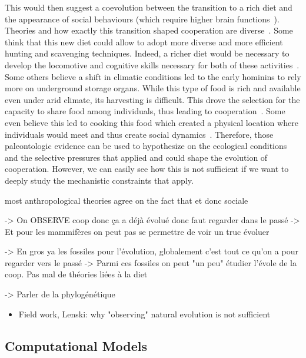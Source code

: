     This would then suggest a coevolution between the transition to a rich diet and the appearance of social behaviours (which require higher brain functions~\cite{Dunbar2007, Isler2012}). Theories and how exactly this transition shaped cooperation are diverse~\cite{Pontze2012}. Some think that this new diet could allow to adopt more diverse and more efficient hunting and scavenging techniques. Indeed, a richer diet would be necessary to develop the locomotive and cognitive skills necessary for both of these activities~\cite{Aiello1995, Bramble2004}. Some others believe a shift in climatic conditions led to the early hominins to rely more on underground storage organs. While this type of food is rich and available even under arid climate, its harvesting is difficult. This drove the selection for the capacity to share food among individuals, thus leading to cooperation~\cite{O'Connell2002}. Some even believe this led to cooking this food which created a physical location where individuals would meet and thus create social dynamics~\cite{Wrangham1999, Wrangham2009}. Therefore, those paleontologic evidence can be used to hypothesize on the ecological conditions and the selective pressures that applied and could shape the evolution of cooperation. However, we can easily see how this is not sufficient if we want to deeply study the mechanistic constraints that apply.



    most anthropological theories agree on the fact that 
    et donc sociale

    -> On OBSERVE coop donc ça a déjà évolué donc faut regarder dans le passé
        -> Et pour les mammifères on peut pas se permettre de voir un truc évoluer

    -> En gros ya les fossiles pour l'évolution, globalement c'est tout ce qu'on a pour regarder vers le passé
          -> Parmi ces fossiles on peut "un peu" étudier l'évole de la coop. Pas mal de théories liées à la diet

    -> Parler de la phylogénétique

    \begin{itemize}
      \item{Field work, Lenski: why "observing" natural evolution is not sufficient}
    \end{itemize}

  \subsection{Computational Models}

